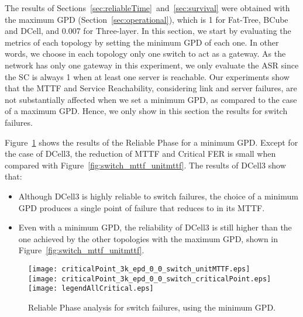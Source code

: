The results of Sections~\ref{sec:reliableTime}~and~\ref{sec:survival} were obtained with the maximum GPD (Section~\ref{sec:operational}), which is 1 for Fat-Tree, BCube and DCell, and 0.007 for Three-layer. In this section, we start by evaluating the metrics of each topology by setting the minimum GPD of each one. In other words, we choose in each topology only one switch to act as a gateway. As the network has only one gateway in this experiment, we only evaluate the ASR since the SC is always 1 when at least one server is reachable. Our experiments show that the MTTF and Service Reachability, considering link and server failures, are not substantially affected when we set a minimum GPD, as compared to the case of a maximum GPD. Hence, we only show in this section the results for switch failures.

Figure~\ref{fig:switch_min_epd_mttf_unitmttf} shows the results of the Reliable Phase for a minimum GPD.
Except for the case of DCell3, the reduction of MTTF and Critical FER is small when compared with Figure~\ref{fig:switch_mttf_unitmttf}. The results of DCell3 show that:
\begin{itemize}
\item Although DCell3 is highly reliable to switch failures, the choice of a minimum GPD produces a single point of failure that reduces to  in its MTTF.
\item Even with a minimum GPD, the reliability of DCell3 is still higher than the one achieved by the other topologies with the maximum GPD, shown in Figure~\ref{fig:switch_mttf_unitmttf}.
\end{itemize}
\begin{figure}
\centering
\texttt{[image: criticalPoint\_3k\_epd\_0\_0\_switch\_unitMTTF.eps]} \quad
\texttt{[image: criticalPoint\_3k\_epd\_0\_0\_switch\_criticalPoint.eps]}
\texttt{[image: legendAllCritical.eps]}
\caption{Reliable Phase analysis for switch failures, using the minimum GPD.}
\label{fig:switch_min_epd_mttf_unitmttf}
\end{figure}

